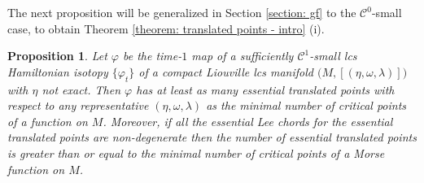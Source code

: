 \documentclass{amsart}
\newtheorem{prop}[thm]{Proposition}
\theoremstyle{remark}
\begin{document}
The next proposition
will be generalized in Section \ref{section: gf}
to the $\mathcal{C}^0$-small case,
to obtain Theorem \ref{theorem: translated points - intro} (i).

\begin{prop}\label{proposition: existence C1 small}
Let $\varphi$ be the time-$1$ map
of a sufficiently $\mathcal{C}^1$-small
lcs Hamiltonian isotopy $\{\varphi_t\}$
of a compact Liouville lcs manifold $\big( M , [(\eta, \omega, \lambda)]\big)$
with $\eta$ not exact.
Then $\varphi$ has at least as many essential translated points
with respect to any representative $(\eta, \omega, \lambda)$
as the minimal number of critical points
of a function on $M$.
Moreover,
if all the essential Lee chords
for the essential translated points are non-degenerate
then the number of essential translated points
is greater than or equal to
the minimal number of critical points
of a Morse function on $M$.
\end{prop}
\end{document}
